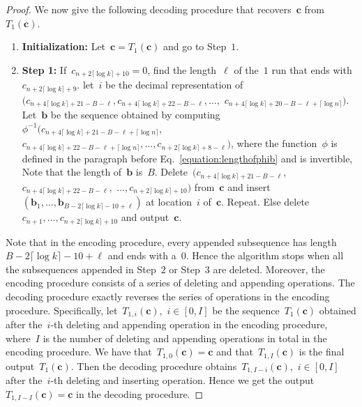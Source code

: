 \documentclass[10pt,a4paper,onecolumn]{IEEEtran}
\newcommand{\1}{\mathbbold{1}}
\newcommand{\boldb}{\mathbf{b}}
\newcommand{\boldc}{\mathbf{c}}
\begin{document}
\begin{proof}
We now give the following decoding procedure that recovers~$\boldc$ from~$T_1(\boldc)$.
\begin{enumerate}
    \item \textbf{Initialization:} Let~$\boldc=T_1(\boldc)$ and go to Step~$1$. 
    \item \textbf{Step 1:} If~$c_{n+2\lceil \log k\rceil+10}=0$, find the length~$\ell$ of the~$1$ run that ends with~$c_{n+2\lceil \log k\rceil+9}$. let~$i$ be the decimal representation of $(c_{n+4\lceil \log k\rceil+21-B-\ell},c_{n+4\lceil \log k\rceil+22-B-\ell},\ldots,$ 
    $c_{n+4\lceil \log k\rceil+20-B-\ell+\lceil \log n\rceil})$. 
    Let~$\boldb$ be the sequence obtained by computing $\phi^{-1}(c_{n+4\lceil \log k\rceil+21-B-\ell+\lceil \log n\rceil},$ 
    $c_{n+4\lceil \log k\rceil+22-B-\ell+\lceil \log n\rceil},\ldots,c_{n+2\lceil \log k\rceil+8-\ell})$, where the function~$\phi$ is defined in the paragraph before Eq.~\eqref{equation:lengthofphib} and is invertible,
    Note that the length of~$\boldb$ is~$B$.
    Delete~$(c_{n+4\lceil \log k\rceil+21-B-\ell},$ $c_{n+4\lceil \log k\rceil+22-B-\ell},$ $\ldots,c_{n+2\lceil \log k\rceil+10})$ from~$\boldc$ and insert~$(\boldb_1,\ldots,\boldb_{B-2\lceil \log k\rceil-10+\ell})$ at location~$i$ of~$\boldc$.
    Repeat. 
    Else delete~$c_{n+1},\ldots,c_{n+2\lceil \log k\rceil+10}$ and
    output~$\boldc$.
\end{enumerate}
Note that in the encoding procedure, every appended subsequence has length~$B-2\lceil \log k\rceil-10+\ell$ and ends with a~$0$. Hence the algorithm stops when all the subsequences appended in Step~$2$ or Step~$3$ are deleted.
Moreover, the encoding procedure consists of a series of deleting and appending operations. The decoding procedure exactly reverses the series of operations in the encoding procedure. Specifically,
let~$T_{1,i}(\boldc)$,~$i\in [0,I]$ be the sequence~$T_1(\boldc)$ obtained after the~$i$-th deleting and appending operation in the encoding procedure, where~$I$ is the number of deleting and appending operations in total in the encoding procedure. We have that~$T_{1,0}(\boldc)=\boldc$ and that~$T_{1,I}(\boldc)$ is the final output~$T_{1}(\boldc)$. Then the decoding procedure obtains~$T_{1,I-i}(\boldc)$,~$i\in [0,I]$ after the~$i$-th deleting and inserting operation. Hence we get the output~$T_{1,I-I}(\boldc)=\boldc$ in the decoding procedure. 
\end{proof}
\end{document}
